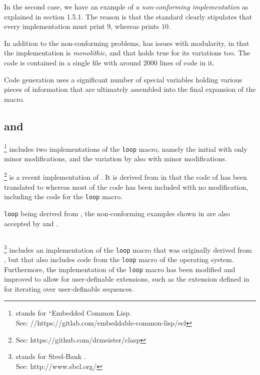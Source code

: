 In the second case, we have an example of \emph{a non-conforming
  implementation} as explained in section 1.5.1.  The reason is that
the standard clearly stipulates that every implementation must print
$9$, whereas \mitloop{} prints $10$.

In addition to the non-conforming problems, \mitloop{} has issues with
modularity, in that the implementation is \emph{monolithic}, and that
holds true for its variations too.  The code is contained in a single
file with around $2000$ lines of code in it.

Code generation uses a significant number of special variables holding
various pieces of information that are ultimately assembled into the
final expansion of the macro.

\subsection{\ecl{} and \clasp{}}

\ecl{}%
\footnote{\ecl{} stands for ``Embedded Common Lisp.\\
See: //https://gitlab.com/embeddable-common-lisp/ecl}
includes two implementations of the \texttt{loop} macro, namely
the initial \mitloop{} with only minor modifications, and the variation
by \symbolics{} also with minor modifications.

\clasp{}%
\footnote{See: https://github.com/drmeister/clasp}
is a recent implementation of \commonlisp{}.  It is derived
from \ecl{} in that the \clanguage{} code of \ecl{} has been
translated to \cplusplus{} whereas most of the \commonlisp{} code has
been included with no modification, including the code for the
\texttt{loop} macro.

\ecl{} \texttt{loop} being derived from \mitloop{}, the non-conforming
examples shown in  are also accepted by \ecl{} and
\clasp{}.

\subsection{\sbcl{}}

\sbcl{}%
\footnote{\sbcl{} stands for Steel-Bank \commonlisp{}.\\ See:
  http://www.sbcl.org/} includes an implementation of the
\texttt{loop} macro that was originally derived from \mitloop{}, but
that also includes code from the \texttt{loop} macro of the \genera{}
operating system.  Furthermore, the \sbcl{} implementation of the
\texttt{loop} macro has been modified and improved to allow for
user-definable extensions, such as the extension defined in
\cite{Rhodes:2007:USC:1622123.1622138} for iterating over
user-definable sequences.

